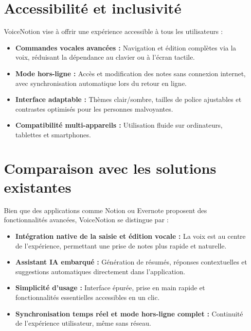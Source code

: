 \section{Accessibilité et inclusivité}
VoiceNotion vise à offrir une expérience accessible à tous les utilisateurs :
\begin{itemize}
    \item \textbf{Commandes vocales avancées :} Navigation et édition complètes via la voix, réduisant la dépendance au clavier ou à l’écran tactile.
    \item \textbf{Mode hors-ligne :} Accès et modification des notes sans connexion internet, avec synchronisation automatique lors du retour en ligne.
    \item \textbf{Interface adaptable :} Thèmes clair/sombre, tailles de police ajustables et contrastes optimisés pour les personnes malvoyantes.
    \item \textbf{Compatibilité multi-appareils :} Utilisation fluide sur ordinateurs, tablettes et smartphones.
\end{itemize}

\section{Comparaison avec les solutions existantes}
Bien que des applications comme Notion ou Evernote proposent des fonctionnalités avancées, VoiceNotion se distingue par :
\begin{itemize}
    \item \textbf{Intégration native de la saisie et édition vocale :} La voix est au centre de l’expérience, permettant une prise de notes plus rapide et naturelle.
    \item \textbf{Assistant IA embarqué :} Génération de résumés, réponses contextuelles et suggestions automatiques directement dans l’application.
    \item \textbf{Simplicité d’usage :} Interface épurée, prise en main rapide et fonctionnalités essentielles accessibles en un clic.
    \item \textbf{Synchronisation temps réel et mode hors-ligne complet :} Continuité de l’expérience utilisateur, même sans réseau.
\end{itemize}

